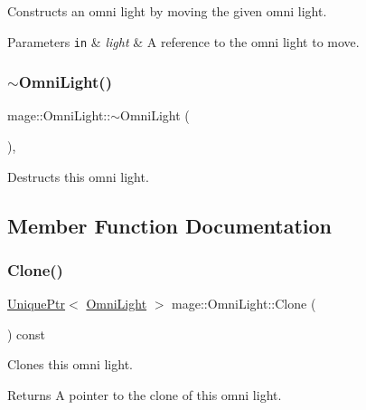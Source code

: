 Constructs an omni light by moving the given omni light.


\begin{DoxyParams}[1]{Parameters}
\mbox{\tt in}  & {\em light} & A reference to the omni light to move. \\
\hline
\end{DoxyParams}
\hypertarget{classmage_1_1_omni_light_af6f4921499b430041966f38aac920b69}{}\label{classmage_1_1_omni_light_af6f4921499b430041966f38aac920b69} 
\subsubsection{\texorpdfstring{$\sim$\+Omni\+Light()}{~OmniLight()}}
{\footnotesize\ttfamily mage\+::\+Omni\+Light\+::$\sim$\+Omni\+Light (\begin{DoxyParamCaption}{ }\end{DoxyParamCaption})\hspace{0.3cm}{\ttfamily [virtual]}, {\ttfamily [default]}}

Destructs this omni light. 

\subsection{Member Function Documentation}
\hypertarget{classmage_1_1_omni_light_a82325924de65733314dcf2b87e926d60}{}\label{classmage_1_1_omni_light_a82325924de65733314dcf2b87e926d60} 
\subsubsection{\texorpdfstring{Clone()}{Clone()}}
{\footnotesize\ttfamily \hyperlink{namespacemage_a3316d7143a973e37adf1110f2e80ca31}{Unique\+Ptr}$<$ \hyperlink{classmage_1_1_omni_light}{Omni\+Light} $>$ mage\+::\+Omni\+Light\+::\+Clone (\begin{DoxyParamCaption}{ }\end{DoxyParamCaption}) const}

Clones this omni light.

\begin{DoxyReturn}{Returns}
A pointer to the clone of this omni light. 
\end{DoxyReturn}
\hypertarget{classmage_1_1_omni_light_a1212457828cdd96cc7170767b7bd1223}{}\label{classmage_1_1_omni_light_a1212457828cdd96cc7170767b7bd1223} 
